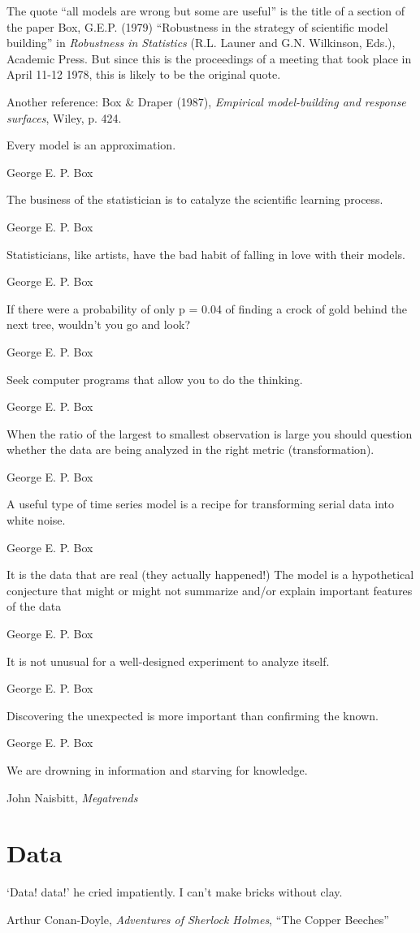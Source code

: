 The quote ``all models are wrong but some are useful'' is the title of a section of the paper Box, G.E.P. (1979) ``Robustness in the strategy of scientific model building'' in \emph{Robustness in Statistics} (R.L. Launer and G.N. Wilkinson, Eds.), Academic Press. But since this is the proceedings of a meeting that took place in April 11-12 1978, this is likely to be the original quote.

Another reference: Box \& Draper (1987), \emph{Empirical model-building and response surfaces}, Wiley, p. 424.

\epigraph{Every model is an approximation.}{George E. P. Box}



\epigraph{The business of the statistician is to catalyze the scientific learning process.}{George E. P. Box}

\epigraph{Statisticians, like artists, have the bad habit of falling in love with their models.}{George E. P. Box}

\epigraph{If there were a probability of only p = 0.04 of finding a crock of gold behind the next tree, wouldn't you go and look?}{George E. P. Box}

\epigraph{Seek computer programs that allow you to do the thinking.}{George E. P. Box}

\epigraph{When the ratio of the largest to smallest observation is large you should question whether the data are being analyzed in the right metric (transformation).}{George E. P. Box}

\epigraph{A useful type of time series model is a recipe for transforming serial data into white noise.}{George E. P. Box}


\epigraph{It is the data that are real (they actually happened!) The model is a hypothetical conjecture that might or might not summarize and/or explain important features of the data}{George E. P. Box}

\epigraph{It is not unusual for a well-designed experiment to analyze itself.}{George E. P. Box}

\epigraph{Discovering the unexpected is more important than confirming the known.}{George E. P. Box} 

\epigraph{We are drowning in information and starving for knowledge.}{John Naisbitt, \emph{Megatrends}}


\section{Data}
\epigraph{`Data! data!' he cried impatiently.  I can't make bricks without clay.}{Arthur Conan-Doyle, \emph{Adventures of Sherlock Holmes}, ``The Copper Beeches''}

